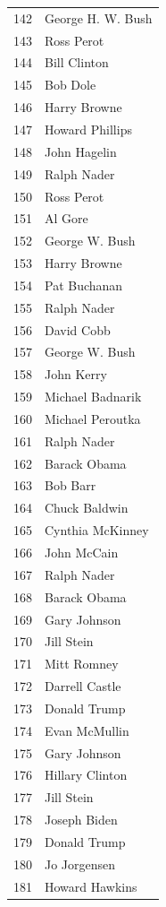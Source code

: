 \documentclass[
  letterpaper,
  DIV=11,
  numbers=noendperiod]{scrreprt}
\begin{document}
\begin{tabular}{ll}
142 &       George H. W. Bush \\
143 &              Ross Perot \\
144 &            Bill Clinton \\
145 &                Bob Dole \\
146 &            Harry Browne \\
147 &         Howard Phillips \\
148 &            John Hagelin \\
149 &             Ralph Nader \\
150 &              Ross Perot \\
151 &                 Al Gore \\
152 &          George W. Bush \\
153 &            Harry Browne \\
154 &            Pat Buchanan \\
155 &             Ralph Nader \\
156 &              David Cobb \\
157 &          George W. Bush \\
158 &              John Kerry \\
159 &        Michael Badnarik \\
160 &        Michael Peroutka \\
161 &             Ralph Nader \\
162 &            Barack Obama \\
163 &                Bob Barr \\
164 &           Chuck Baldwin \\
165 &        Cynthia McKinney \\
166 &             John McCain \\
167 &             Ralph Nader \\
168 &            Barack Obama \\
169 &            Gary Johnson \\
170 &              Jill Stein \\
171 &             Mitt Romney \\
172 &          Darrell Castle \\
173 &            Donald Trump \\
174 &           Evan McMullin \\
175 &            Gary Johnson \\
176 &         Hillary Clinton \\
177 &              Jill Stein \\
178 &            Joseph Biden \\
179 &            Donald Trump \\
180 &            Jo Jorgensen \\
181 &          Howard Hawkins \\
\bottomrule
\end{tabular}
\end{document}
